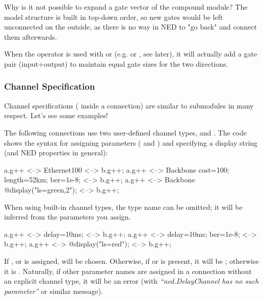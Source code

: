 \begin{note}
    Why is it not possible to expand a gate vector of the compound
    module? The model structure is built in top-down order, so new gates
    would be left unconnected on the outside, as there is no way in NED to
    "go back" and connect them afterwards.
\end{note}

When the \ttt{++} operator is used with  or 
(e.g.  or , see later), it will actually add
a gate pair (input+output) to maintain equal gate sizes for the two
directions.



\subsubsection{Channel Specification}

Channel specifications ( inside a connection)
are similar to submodules in many respect. Let's see some examples!

The following connections use two user-defined channel types,
 and . The code shows the syntax
for assigning parameters ( and ) and specifying
a display string (and NED properties in general):

\begin{ned}
a.g++ <--> Ethernet100 <--> b.g++;
a.g++ <--> Backbone {cost=100; length=52km; ber=1e-8;} <--> b.g++;
a.g++ <--> Backbone {@display("ls=green,2");} <--> b.g++;
\end{ned}

When using built-in channel types, the type name can be omitted; it
will be inferred from the parameters you assign.

\begin{ned}
a.g++ <--> {delay=10ms;} <--> b.g++;
a.g++ <--> {delay=10ms; ber=1e-8;} <--> b.g++;
a.g++ <--> {@display("ls=red");} <--> b.g++;
\end{ned}

If ,  or  is assigned,
 will be chosen. Otherwise, if  or
 is present, it will be ; otherwise it
is . Naturally, if other parameter names are assigned
in a connection without an explicit channel type, it will be an error (with
\textit{``ned.DelayChannel has no such parameter''} or similar message).

